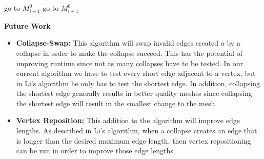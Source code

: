 \documentclass{article}
\begin{document}
\begin{algorithm}[H]
\begin{algorithmic}[1]
                \State go to $M^0_{i+1}$
            \EndIf
                \State go to $M^0_{i+1}$
            \EndIf
        \EndIf
    \EndWhile
\end{algorithmic}
\end{algorithm}

\textbf{Future Work}

\begin{itemize}
    \item \textbf{Collapse-Swap:} This algorithm will swap invalid edges created a by a collapse in order to make the collapse succeed. This has the potential of improving runtime since not as many collapses have to be tested. In our current algorithm we have to test every short edge adjacent to a vertex, but in Li's algorithm he only has to test the shortest edge. In addition, collapsing the shortest edge generally results in better quality meshes since collapsing the shortest edge will result in the smallest change to the mesh.
    \item \textbf{Vertex Reposition:} This addition to the algorithm will improve edge lengths. As described in Li's algorithm, when a collapse creates an edge that is longer than the desired maximum edge length, then vertex repositioning can be run in order to improve those edge lengths.
\end{itemize}
\end{document}
